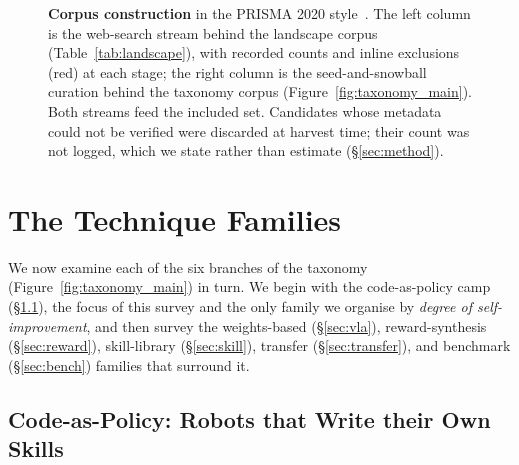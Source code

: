 \documentclass[acmsmall,screen,nonacm]{acmart}
\begin{document}
\begin{figure}[t]
{\begin{tikzpicture}
\end{tikzpicture}}
\caption{\textbf{Corpus construction} in the PRISMA 2020 style~\citep{prisma2020}. The left column
is the web-search stream behind the landscape corpus (Table~\ref{tab:landscape}), with recorded
counts and inline exclusions (red) at each stage; the right column is the seed-and-snowball
curation behind the taxonomy corpus (Figure~\ref{fig:taxonomy_main}). Both streams feed the
included set. Candidates whose metadata could not be verified were discarded at harvest time; their
count was not logged, which we state rather than estimate (\S\ref{sec:method}).}
\label{fig:prisma}
\end{figure}
\section{The Technique Families}
\label{sec:techniques}

We now examine each of the six branches of the taxonomy (Figure~\ref{fig:taxonomy_main}) in
turn. We begin with the code-as-policy camp (\S\ref{sec:code}), the focus of this survey and
the only family we organise by \emph{degree of self-improvement}, and then survey the
weights-based (\S\ref{sec:vla}), reward-synthesis (\S\ref{sec:reward}), skill-library
(\S\ref{sec:skill}), transfer (\S\ref{sec:transfer}), and benchmark (\S\ref{sec:bench})
families that surround it.
\subsection{Code-as-Policy: Robots that Write their Own Skills}
\label{sec:code}
\end{document}
